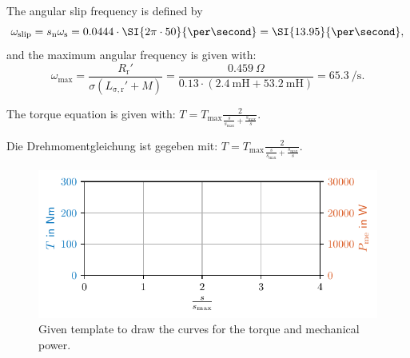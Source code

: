 
\begin{solutionblock}
    The angular slip frequency is defined by
    $$ \omega_{\mathrm{slip}} = s_{\mathrm{n}} \omega_{\mathrm{s}} = 0.0444 \cdot \SI{2\pi \cdot 50}{\per\second} = \SI{13.95}{\per\second},$$
    and the maximum angular frequency is given with:
    $$ \omega_{\mathrm{max}} = \frac{R_{\mathrm{r}}'}{\sigma \left(L_{\mathrm{\sigma,r}}' + M\right)} = \frac{\SI{0.459}{\Omega}}{0.13\cdot \left(\SI{2.4}{\milli\henry} + \SI{53.2}{\milli\henry}\right)} = \SI{65.3}{\per\second}. $$

\end{solutionblock}

\begin{hintblock}
    The torque equation is given with: $T = T_{\mathrm{max}} \frac{2}{\frac{s}{s_{\mathrm{max}}}+ \frac{s_{\mathrm{max}}}{s}}$.
\end{hintblock}
\begin{germanhintblock}
    Die Drehmomentgleichung ist gegeben mit: $T = T_{\mathrm{max}} \frac{2}{\frac{s}{s_{\mathrm{max}}}+ \frac{s_{\mathrm{max}}}{s}}$.
\end{germanhintblock}

\begin{figure}[htb]
    \centering
    \includegraphics{fig/task_T_P.pdf}
    \caption{Given template to draw the curves for the torque and mechanical power.}
    \label{fig:task_T_P}
\end{figure}

